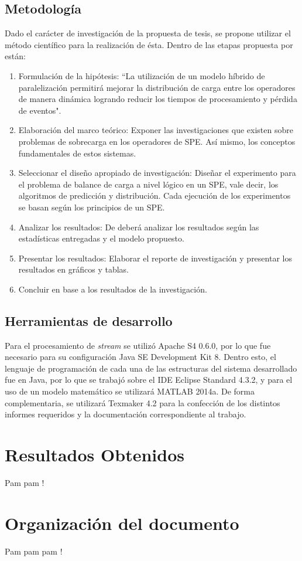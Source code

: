 \subsection{Metodología}
Dado el carácter de investigación de la propuesta de tesis, se propone utilizar el método científico para la realización de ésta. Dentro de las etapas propuesta por \citep{hernandez2010metodologia} están:

\begin{enumerate}
	\item Formulación de la hipótesis: ``La utilización de un modelo híbrido de paralelización permitirá mejorar la distribución de carga entre los operadores de manera dinámica logrando reducir los tiempos de procesamiento y pérdida de eventos".
	\item Elaboración del marco teórico: Exponer las investigaciones que existen sobre problemas de sobrecarga en los operadores de SPE. Así mismo, los conceptos fundamentales de estos sistemas.
	\item Seleccionar el diseño apropiado de investigación: Diseñar el experimento para el problema de balance de carga a nivel lógico en un SPE, vale decir, los algoritmos de predicción y distribución. Cada ejecución de los experimentos se basan según los principios de un SPE.
	\item Analizar los resultados: De deberá analizar los resultados según las estadísticas entregadas y el modelo propuesto.
	\item Presentar los resultados: Elaborar el reporte de investigación y presentar los resultados en gráficos y tablas.
	\item Concluir en base a los resultados de la investigación.
\end{enumerate}

\subsection{Herramientas de desarrollo}
Para el procesamiento de \textsl{stream} se utilizó Apache S4 0.6.0, por lo que fue necesario para su configuración Java SE Development Kit 8. Dentro esto, el lenguaje de programación de cada una de las estructuras del sistema desarrollado fue en Java, por lo que se trabajó sobre el IDE Eclipse Standard 4.3.2, y para el uso de un modelo matemático se utilizará MATLAB 2014a. De forma complementaria, se utilizará Texmaker 4.2 para la confección de los distintos informes requeridos y la documentación correspondiente al trabajo.

\section{Resultados Obtenidos}
\label{intro:resultados}
Pam pam !

\section{Organización del documento}
\label{intro:organizacion}
Pam pam pam !

